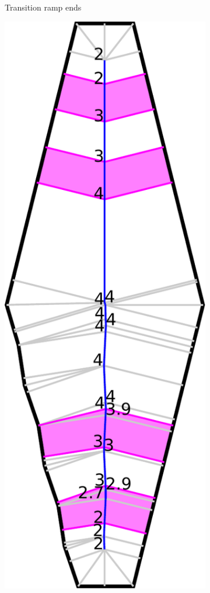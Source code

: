 \begin{figure}
\begin{subfigure}{\figwidth}
\caption{Transition ramp ends}\label{beading_transitioning_filtering__transition_ends}
\end{subfigure}
\begin{subfigure}{\figwidth}
\includegraphics[width=\columnwidth]{sources/method/beading_transitioning_filtering__transitions_applied.pdf}

\end{subfigure}
\end{figure}
